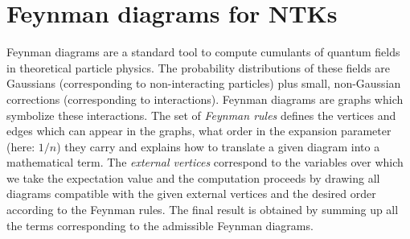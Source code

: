 \section{Feynman diagrams for NTKs}
\label{feynman-diagrams-NTKs}

Feynman diagrams are a standard tool to compute cumulants of quantum fields in theoretical particle physics. The probability distributions of these fields are Gaussians (corresponding to non-interacting particles) plus small, non-Gaussian corrections (corresponding to interactions). Feynman diagrams are graphs which symbolize these interactions. The set of \emph{Feynman rules} defines the vertices and edges which can appear in the graphs, what order in the expansion parameter (here: $1/n$) they carry and explains how to translate a given diagram into a mathematical term. The \emph{external vertices} correspond to the variables over which we take the expectation value and the computation proceeds by drawing all diagrams compatible with the given external vertices and the desired order according to the Feynman rules. The final result is obtained by summing up all the terms corresponding to the admissible Feynman diagrams.






